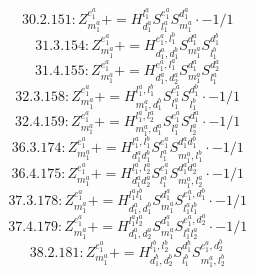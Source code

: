\documentclass[letterpaper,10pt,fleqn,leqno,onecolumn]{article}
\begin{document}
\begin{equation} \;\;\;\;\;\;  30.2.151: Z^{e_{1}^{a}}_{m_{1}^{a}}+=H^{l_{1}^{a}}_{d_{1}^{a}}S^{e_{1}^{a}}_{l_{1}^{a}}S^{d_{1}^{a}}_{m_{1}^{a}}\cdot -1/1 \end{equation}
\begin{equation} \;\;\;\;\;\;  31.3.154: Z^{e_{1}^{a}}_{m_{1}^{a}}+=H^{e_{1}^{a},l_{1}^{b}}_{d_{1}^{a},d_{1}^{b}}S^{d_{1}^{a}}_{m_{1}^{a}}S^{d_{1}^{b}}_{l_{1}^{b}} \end{equation}
\begin{equation} \;\;\;\;\;\;  31.4.155: Z^{e_{1}^{a}}_{m_{1}^{a}}+=H^{e_{1}^{a},l_{1}^{a}}_{d_{1}^{a},d_{2}^{a}}S^{d_{1}^{a}}_{m_{1}^{a}}S^{d_{2}^{a}}_{l_{1}^{a}} \end{equation}
\begin{equation} \;\;\;\;\;\;  32.3.158: Z^{e_{1}^{a}}_{m_{1}^{a}}+=H^{l_{1}^{a},l_{1}^{b}}_{m_{1}^{a},d_{1}^{b}}S^{e_{1}^{a}}_{l_{1}^{a}}S^{d_{1}^{b}}_{l_{1}^{b}}\cdot -1/1 \end{equation}
\begin{equation} \;\;\;\;\;\;  32.4.159: Z^{e_{1}^{a}}_{m_{1}^{a}}+=H^{l_{1}^{a},l_{2}^{a}}_{m_{1}^{a},d_{1}^{a}}S^{e_{1}^{a}}_{l_{1}^{a}}S^{d_{1}^{a}}_{l_{2}^{a}}\cdot -1/1 \end{equation}
\begin{equation} \;\;\;\;\;\;  36.3.174: Z^{e_{1}^{a}}_{m_{1}^{a}}+=H^{l_{1}^{a},l_{1}^{b}}_{d_{1}^{a}d_{1}^{b}}S^{e_{1}^{a}}_{l_{1}^{a}}S^{d_{1}^{a}d_{1}^{b}}_{m_{1}^{a},l_{1}^{b}}\cdot -1/1 \end{equation}
\begin{equation} \;\;\;\;\;\;  36.4.175: Z^{e_{1}^{a}}_{m_{1}^{a}}+=H^{l_{1}^{a},l_{2}^{a}}_{d_{1}^{a}d_{2}^{a}}S^{e_{1}^{a}}_{l_{1}^{a}}S^{d_{1}^{a}d_{2}^{a}}_{m_{1}^{a},l_{2}^{a}}\cdot -1/1 \end{equation}
\begin{equation} \;\;\;\;\;\;  37.3.178: Z^{e_{1}^{a}}_{m_{1}^{a}}+=H^{l_{1}^{a}l_{1}^{b}}_{d_{1}^{a},d_{1}^{b}}S^{d_{1}^{a}}_{m_{1}^{a}}S^{e_{1}^{a},d_{1}^{b}}_{l_{1}^{a}l_{1}^{b}}\cdot -1/1 \end{equation}
\begin{equation} \;\;\;\;\;\;  37.4.179: Z^{e_{1}^{a}}_{m_{1}^{a}}+=H^{l_{1}^{a}l_{2}^{a}}_{d_{1}^{a},d_{2}^{a}}S^{d_{1}^{a}}_{m_{1}^{a}}S^{e_{1}^{a},d_{2}^{a}}_{l_{1}^{a}l_{2}^{a}}\cdot -1/1 \end{equation}
\begin{equation} \;\;\;\;\;\;  38.2.181: Z^{e_{1}^{a}}_{m_{1}^{a}}+=H^{l_{1}^{b},l_{2}^{b}}_{d_{1}^{b},d_{2}^{b}}S^{d_{1}^{b}}_{l_{1}^{b}}S^{e_{1}^{a},d_{2}^{b}}_{m_{1}^{a},l_{2}^{b}} \end{equation}
\end{document}
